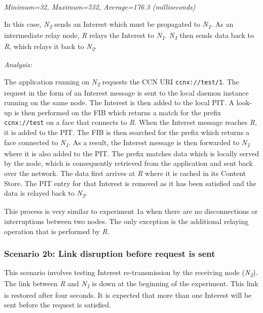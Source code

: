 \documentclass[a4paper,12pt]{report}      %
\begin{document}
\begin{center}\textsl{Minimum=32, Maximum=532, Average=176.3 (milliseconds)}\end{center}

In this case,  \emph{N\textsubscript{2}} sends an Interest which must be propagated to  \emph{N\textsubscript{1}}. As an intermediate relay
node,  \emph{R} relays the Interest to  \emph{N\textsubscript{1}}. \emph{N\textsubscript{1}} then sends data back to  \emph{R}, which relays it back to  \emph{N\textsubscript{2}}.

\vspace*{1\baselineskip}\noindent\emph{Analysis:}

The application running on  \emph{N\textsubscript{2}} requests the CCN URI \verb!ccnx://test/1!. The request in the form
of an Interest message is sent to the local daemon instance running on the same node. The Interest is
then added to the local PIT. A look-up is then performed on the FIB which returns a match for
 the prefix \verb!ccnx://test! on a face that connects to \emph{R}. 
When the Interest message reaches \emph{R}, it is added to the PIT. 
The FIB is then searched for the prefix which returns a face connected to \emph{N\textsubscript{1}}. As a result, the
Interest message is then forwarded to \emph{N\textsubscript{1}} where it is also added to the PIT. The prefix matches data
which is locally served by the node, which is consequently retrieved from the application and sent back
over the network. The data first arrives at \emph{R} where it is cached in its Content Store.
The PIT entry for that Interest is removed as it has been satisfied and the data is relayed back to  \emph{N\textsubscript{2}}.

This process is very similar to experiment 1a when there are no disconnections or interruptions
between two nodes. The only exception is the additional relaying operation that is performed by \emph{R}. %

\subsubsection{Scenario 2b: Link disruption before request is sent}

This scenario involves testing Interest re-transmission by the receiving node (\emph{N\textsubscript{2}}). The link
between \emph{R} and \emph{N\textsubscript{1}} is down at the beginning of the experiment. This link is restored after
four seconds. It is expected that more than one Interest will be sent before the request is satisfied.
\end{document}
